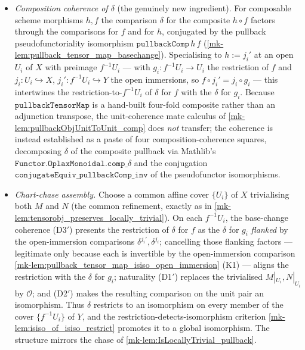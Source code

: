 \begin{itemize}
  \item[(D3$'$)] \emph{Composition coherence of \(\delta\)} (the genuinely new
    ingredient). For composable scheme morphisms \(h, f\) the comparison \(\delta\) for
    the composite \(h \circ f\) factors through the comparisons for \(f\) and for \(h\),
    conjugated by the pullback pseudofunctoriality isomorphism
    \(\mathtt{pullbackComp}\,h\,f\) (\ref{mk-lem:pullback_tensor_map_basechange}).
    Specialising to \(h := j_i'\) at an open \(U_i\) of \(X\) with preimage
    \(f^{-1}U_i\) --- with \(g_i : f^{-1}U_i \to U_i\) the restriction of \(f\) and
    \(j_i : U_i \hookrightarrow X\), \(j_i' : f^{-1}U_i \hookrightarrow Y\) the open
    immersions, so \(f \circ j_i' = j_i \circ g_i\) --- this intertwines the
    restriction-to-\(f^{-1}U_i\) of \(\delta\) for \(f\) with the \(\delta\) for
    \(g_i\). Because \(\mathtt{pullbackTensorMap}\) is a hand-built four-fold composite
    rather than an adjunction transpose, the unit-coherence mate calculus of
    \ref{mk-lem:pullbackObjUnitToUnit_comp} does \emph{not} transfer; the coherence is
    instead established as a paste of four composition-coherence squares, decomposing
    \(\delta\) of the composite pullback via Mathlib's
    \(\mathtt{Functor.OplaxMonoidal.comp\_}\delta\) and the conjugation
    \(\mathtt{conjugateEquiv\_pullbackComp\_inv}\) of the pseudofunctor isomorphisms.
  \item[(D4$'$)] \emph{Chart-chase assembly.} Choose a common affine cover \(\{U_i\}\)
    of \(X\) trivialising both \(M\) and \(N\) (the common refinement, exactly as in
    \ref{mk-lem:tensorobj_preserves_locally_trivial}). On each \(f^{-1}U_i\), the
    base-change coherence (D3$'$) presents the restriction of \(\delta\) for \(f\) as the
    \(\delta\) for \(g_i\) \emph{flanked} by the open-immersion comparisons
    \(\delta^{j_i'}, \delta^{j_i}\); cancelling those flanking factors --- legitimate only
    because each is invertible by the open-immersion comparison
    \ref{mk-lem:pullback_tensor_map_isiso_open_immersion} (K1) --- aligns the restriction with
    the \(\delta\) for \(g_i\); naturality (D1$'$) replaces the trivialised
    \(M|_{U_i}, N|_{U_i}\) by \(\mathcal{O}\); and (D2$'$) makes the resulting
    comparison on the unit pair an isomorphism. Thus \(\delta\) restricts to an
    isomorphism on every member of the cover \(\{f^{-1}U_i\}\) of \(Y\), and the
    restriction-detects-isomorphism criterion
    \ref{mk-lem:isiso_of_isiso_restrict} promotes it to a global isomorphism. The
    structure mirrors the chase of \ref{mk-lem:IsLocallyTrivial_pullback}.
\end{itemize}
